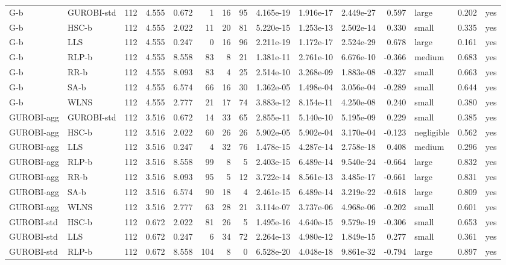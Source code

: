 \begin{table}[htbp]
\begin{tabular}{llrrrrrrrrrrlrr}
G-b & GUROBI-std & 112 & 4.555 & 0.672 & 1 & 16 & 95 & 4.165e-19 & 1.916e-17 & 2.449e-27 & 0.597 & large & 0.202 & yes \\
G-b & HSC-b & 112 & 4.555 & 2.022 & 11 & 20 & 81 & 5.220e-15 & 1.253e-13 & 2.502e-14 & 0.330 & small & 0.335 & yes \\
G-b & LLS & 112 & 4.555 & 0.247 & 0 & 16 & 96 & 2.211e-19 & 1.172e-17 & 2.524e-29 & 0.678 & large & 0.161 & yes \\
G-b & RLP-b & 112 & 4.555 & 8.558 & 83 & 8 & 21 & 1.381e-11 & 2.761e-10 & 6.676e-10 & -0.366 & medium & 0.683 & yes \\
G-b & RR-b & 112 & 4.555 & 8.093 & 83 & 4 & 25 & 2.514e-10 & 3.268e-09 & 1.883e-08 & -0.327 & small & 0.663 & yes \\
G-b & SA-b & 112 & 4.555 & 6.574 & 66 & 16 & 30 & 1.362e-05 & 1.498e-04 & 3.056e-04 & -0.289 & small & 0.644 & yes \\
G-b & WLNS & 112 & 4.555 & 2.777 & 21 & 17 & 74 & 3.883e-12 & 8.154e-11 & 4.250e-08 & 0.240 & small & 0.380 & yes \\
GUROBI-agg & GUROBI-std & 112 & 3.516 & 0.672 & 14 & 33 & 65 & 2.855e-11 & 5.140e-10 & 5.195e-09 & 0.229 & small & 0.385 & yes \\
GUROBI-agg & HSC-b & 112 & 3.516 & 2.022 & 60 & 26 & 26 & 5.902e-05 & 5.902e-04 & 3.170e-04 & -0.123 & negligible & 0.562 & yes \\
GUROBI-agg & LLS & 112 & 3.516 & 0.247 & 4 & 32 & 76 & 1.478e-15 & 4.287e-14 & 2.758e-18 & 0.408 & medium & 0.296 & yes \\
GUROBI-agg & RLP-b & 112 & 3.516 & 8.558 & 99 & 8 & 5 & 2.403e-15 & 6.489e-14 & 9.540e-24 & -0.664 & large & 0.832 & yes \\
GUROBI-agg & RR-b & 112 & 3.516 & 8.093 & 95 & 5 & 12 & 3.722e-14 & 8.561e-13 & 3.485e-17 & -0.661 & large & 0.831 & yes \\
GUROBI-agg & SA-b & 112 & 3.516 & 6.574 & 90 & 18 & 4 & 2.461e-15 & 6.489e-14 & 3.219e-22 & -0.618 & large & 0.809 & yes \\
GUROBI-agg & WLNS & 112 & 3.516 & 2.777 & 63 & 28 & 21 & 3.114e-07 & 3.737e-06 & 4.968e-06 & -0.202 & small & 0.601 & yes \\
GUROBI-std & HSC-b & 112 & 0.672 & 2.022 & 81 & 26 & 5 & 1.495e-16 & 4.640e-15 & 9.579e-19 & -0.306 & small & 0.653 & yes \\
GUROBI-std & LLS & 112 & 0.672 & 0.247 & 6 & 34 & 72 & 2.264e-13 & 4.980e-12 & 1.849e-15 & 0.277 & small & 0.361 & yes \\
GUROBI-std & RLP-b & 112 & 0.672 & 8.558 & 104 & 8 & 0 & 6.528e-20 & 4.048e-18 & 9.861e-32 & -0.794 & large & 0.897 & yes \\

\end{tabular}
\end{table}
